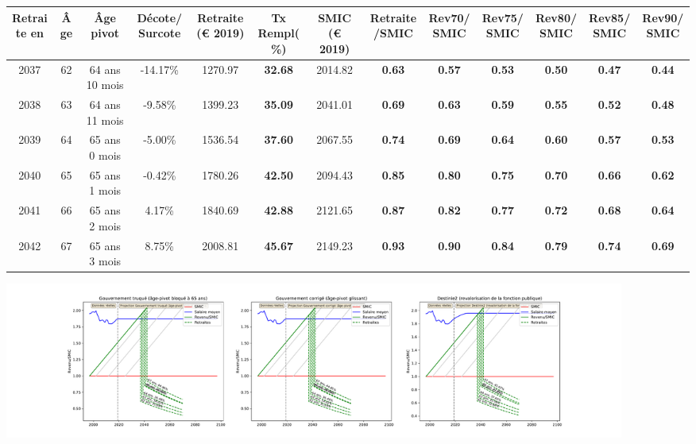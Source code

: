 { \scriptsize \begin{center} 
\begin{tabular}[htb]{|c|c||c|c||c|c||c||c|c|c|c|c|c|} 
\hline 
 Retraite en &  Âge &  Âge pivot &  Décote/Surcote &  Retraite (\euro{} 2019) &  Tx Rempl(\%) &  SMIC (\euro{} 2019) &  Retraite/SMIC &  Rev70/SMIC &  Rev75/SMIC &  Rev80/SMIC &  Rev85/SMIC &  Rev90/SMIC \\ 
\hline \hline 
 2037 &  62 &  64 ans 10 mois &  -14.17\% &  1270.97 &  {\bf 32.68} &  2014.82 &  {\bf {\color{red} 0.63}} &  {\bf {\color{red} 0.57}} &  {\bf {\color{red} 0.53}} &  {\bf {\color{red} 0.50}} &  {\bf {\color{red} 0.47}} &  {\bf {\color{red} 0.44}} \\ 
\hline 
 2038 &  63 &  64 ans 11 mois &  -9.58\% &  1399.23 &  {\bf 35.09} &  2041.01 &  {\bf {\color{red} 0.69}} &  {\bf {\color{red} 0.63}} &  {\bf {\color{red} 0.59}} &  {\bf {\color{red} 0.55}} &  {\bf {\color{red} 0.52}} &  {\bf {\color{red} 0.48}} \\ 
\hline 
 2039 &  64 &  65 ans 0 mois &  -5.00\% &  1536.54 &  {\bf 37.60} &  2067.55 &  {\bf {\color{red} 0.74}} &  {\bf {\color{red} 0.69}} &  {\bf {\color{red} 0.64}} &  {\bf {\color{red} 0.60}} &  {\bf {\color{red} 0.57}} &  {\bf {\color{red} 0.53}} \\ 
\hline 
 2040 &  65 &  65 ans 1 mois &  -0.42\% &  1780.26 &  {\bf 42.50} &  2094.43 &  {\bf {\color{red} 0.85}} &  {\bf {\color{red} 0.80}} &  {\bf {\color{red} 0.75}} &  {\bf {\color{red} 0.70}} &  {\bf {\color{red} 0.66}} &  {\bf {\color{red} 0.62}} \\ 
\hline 
 2041 &  66 &  65 ans 2 mois &  4.17\% &  1840.69 &  {\bf 42.88} &  2121.65 &  {\bf {\color{red} 0.87}} &  {\bf {\color{red} 0.82}} &  {\bf {\color{red} 0.77}} &  {\bf {\color{red} 0.72}} &  {\bf {\color{red} 0.68}} &  {\bf {\color{red} 0.64}} \\ 
\hline 
 2042 &  67 &  65 ans 3 mois &  8.75\% &  2008.81 &  {\bf 45.67} &  2149.23 &  {\bf {\color{red} 0.93}} &  {\bf {\color{red} 0.90}} &  {\bf {\color{red} 0.84}} &  {\bf {\color{red} 0.79}} &  {\bf {\color{red} 0.74}} &  {\bf {\color{red} 0.69}} \\ 
\hline 
\hline 
\end{tabular} 
\end{center} } 

 \begin{center}\includegraphics[width=0.9\textwidth]{fig/Ascendant12_1975_22_dest_retraite.pdf}\end{center} \label{fig/Ascendant12_1975_22_dest_retraite.pdf} 

